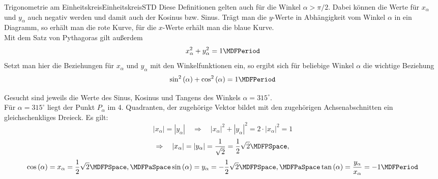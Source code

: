 \begin{MXContent}{Trigonometrie am Einheitskreis}{Einheitskreis}{STD}
Diese Definitionen gelten auch f\"ur die Winkel $\alpha>\pi/2$. Dabei k\"onnen die Werte f\"ur $x_\alpha$ und $y_\alpha$ auch negativ werden und damit auch der Kosinus bzw. Sinus. Tr\"agt man die $y$-Werte in Abh\"angigkeit vom Winkel $\alpha$ in ein Diagramm, so erh\"alt man die rote Kurve, f\"ur die $x$-Werte erh\"alt man die blaue Kurve.
\ \\
Mit dem Satz von Pythagoras gilt au\ss erdem
\[x_{\alpha}^{2}+y_{\alpha}^{2}=1 \MDFPeriod\]
Setzt man hier die Beziehungen f\"ur $x_{\alpha}$ und $y_{\alpha}$ mit den Winkelfunktionen ein, so ergibt sich f\"ur beliebige Winkel $\alpha$ die wichtige Beziehung
\[\sin^2\left(\alpha\right)+\cos^2\left(\alpha\right)=1 \MDFPeriod\]


\begin{MExample}
Gesucht sind jeweils die Werte des Sinus, Kosinus und Tangens des Winkels $\alpha=315^\circ$.\\

F\"ur $\alpha=315^\circ$ liegt der Punkt $P_\alpha$ im 4. Quadranten, der zugeh\"orige Vektor bildet mit den zugeh\"origen Achsenabschnitten ein gleichschenkliges Dreieck. Es gilt: \[\left|x_\alpha\right|=\left|y_\alpha\right|\quad\Rightarrow\quad \left|x_\alpha\right|^2+\left|y_\alpha\right|^2=2\cdot\left|x_\alpha\right|^2=1\]
\[\Rightarrow\quad \left|x_\alpha\right|=\left|y_\alpha\right|=\frac{1}{\sqrt 2}=\frac{1}{2}\sqrt 2 \MDFPSpace,\]
\[\cos\left(\alpha\right)=x_\alpha=\frac{1}{2}\sqrt 2 \MDFPSpace,	\MDFPaSpace	\sin\left(\alpha\right)=y_\alpha=-\frac{1}{2}\sqrt 2 \MDFPSpace,	\MDFPaSpace	\tan\left(\alpha\right)=\frac{y_\alpha}{x_\alpha}=-1 \MDFPeriod\]
\end{MExample}

\end{MXContent}



